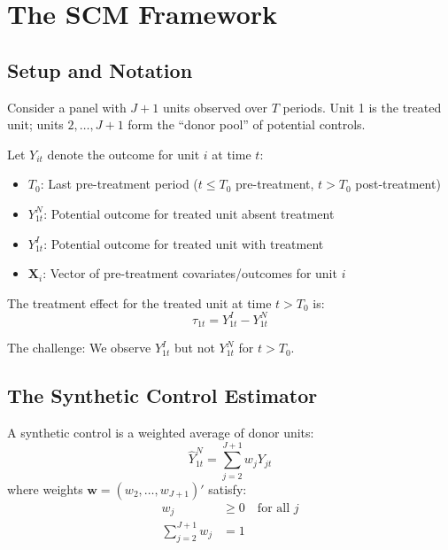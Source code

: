 \section{The SCM Framework}
\label{sec:scm_framework}

\subsection{Setup and Notation}

Consider a panel with $J + 1$ units observed over $T$ periods. Unit 1 is the treated unit; units $2, \ldots, J+1$ form the ``donor pool'' of potential controls.

\begin{definition}
\label{def:scm_setup}
Let $Y_{it}$ denote the outcome for unit $i$ at time $t$:
\begin{itemize}
    \item $T_0$: Last pre-treatment period ($t \leq T_0$ pre-treatment, $t > T_0$ post-treatment)
    \item $Y_{1t}^N$: Potential outcome for treated unit absent treatment
    \item $Y_{1t}^I$: Potential outcome for treated unit with treatment
    \item $\mathbf{X}_i$: Vector of pre-treatment covariates/outcomes for unit $i$
\end{itemize}
\end{definition}

The treatment effect for the treated unit at time $t > T_0$ is:
\begin{equation}
    \tau_{1t} = Y_{1t}^I - Y_{1t}^N
    \label{eq:scm_effect}
\end{equation}

The challenge: We observe $Y_{1t}^I$ but not $Y_{1t}^N$ for $t > T_0$.

\subsection{The Synthetic Control Estimator}

\begin{definition}
\label{def:synthetic_control}
A synthetic control is a weighted average of donor units:
\begin{equation}
    \hat{Y}_{1t}^N = \sum_{j=2}^{J+1} w_j Y_{jt}
\end{equation}
where weights $\mathbf{w} = (w_2, \ldots, w_{J+1})'$ satisfy:
\begin{align}
    w_j &\geq 0 \quad \text{for all } j \\
    \sum_{j=2}^{J+1} w_j &= 1
\end{align}
\end{definition}

